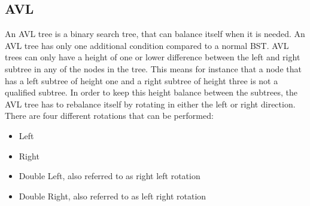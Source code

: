 \subsection{AVL}
An AVL tree is a binary search tree, that can balance itself when it is needed. An AVL tree has only one additional condition compared to a normal BST. AVL trees can only have a height of one or lower difference between the left and right subtree in any of the nodes in the tree. This means for instance that a node that has a left subtree of height one and a right subtree of height three is not a qualified subtree. In order to keep this height balance between the subtrees, the AVL tree has to rebalance itself by rotating in either the left or right direction.
\\[11pt]
There are four different rotations that can be performed:
\begin{itemize}
    \item{Left}
    \item{Right}
    \item{Double Left, also referred to as right left rotation}
    \item{Double Right, also referred to as left right rotation}
\end{itemize}
